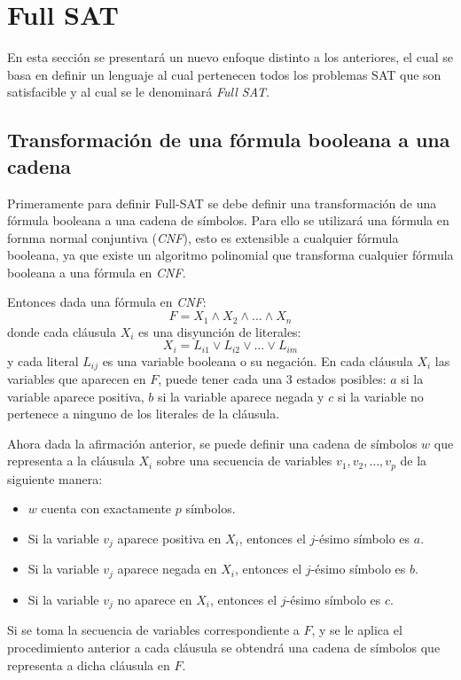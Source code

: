 \documentclass{book}
\begin{document}
\chapter{Full SAT}

En esta sección se presentará un nuevo enfoque distinto a los anteriores, el cual se basa en definir un lenguaje al cual
pertenecen todos los problemas SAT que son satisfacible y al cual se le denominará \textit{Full SAT}.

\section{Transformación de una fórmula booleana a una cadena}

Primeramente para definir Full-SAT se debe definir una transformación de una fórmula booleana a una cadena de símbolos.
Para ello se utilizará una fórmula en fornma normal conjuntiva (\textit{CNF}), esto es extensible a cualquier fórmula booleana, ya que existe un
algoritmo polinomial que transforma cualquier fórmula booleana a una fórmula en \textit{CNF}.

Entonces  dada una fórmula en \textit{CNF}:
$$F=X_1 \wedge X_2 \wedge \ldots \wedge X_n$$
donde cada cláusula $X_i$ es una disyunción de literales:
$$X_i=L_{i1} \vee L_{i2} \vee \ldots \vee L_{im}$$
y cada literal $L_{ij}$ es una variable booleana o su negación. En cada cláusula $X_i$ las variables que aparecen en $F$,
puede tener cada una 3 estados posibles: $a$ si la variable aparece positiva, $b$ si la variable aparece negada y $c$ si la variable
no pertenece a ninguno de los literales de la cláusula.

Ahora dada la afirmación anterior, se puede definir una cadena de símbolos $w$
que representa a la cláusula $X_i$ sobre una secuencia de variables $v_1,v_2,\ldots,v_p$ de la siguiente manera:

\begin{itemize}
    \item $w$ cuenta con exactamente $p$ símbolos.
    \item Si la variable $v_j$ aparece positiva en $X_i$, entonces el $j$-ésimo símbolo es $a$.
    \item Si la variable $v_j$ aparece negada en $X_i$, entonces el $j$-ésimo símbolo es $b$.
    \item Si la variable $v_j$ no aparece en $X_i$, entonces el $j$-ésimo símbolo es $c$.
\end{itemize}
Si se toma la secuencia de variables correspondiente a $F$, y se le aplica el procedimiento anterior a cada cláusula
se obtendrá una cadena de símbolos que representa a dicha cláusula en $F$.
\end{document}
